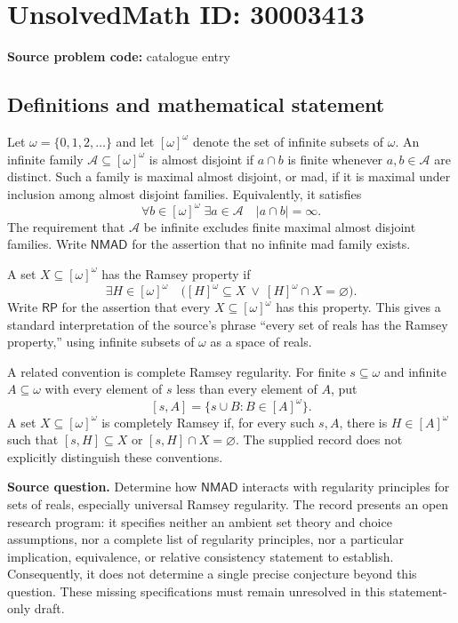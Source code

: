 \documentclass[11pt]{article}
\begin{document}
\section*{UnsolvedMath ID: 30003413}
\textbf{Source problem code:} catalogue entry
\subsection{Definitions and mathematical statement}
Let \(\omega=\{0,1,2,\ldots\}\) and let \([\omega]^\omega\) denote the set of infinite subsets of \(\omega\). An infinite family \(\mathcal A\subseteq[\omega]^\omega\) is almost disjoint if \(a\cap b\) is finite whenever \(a,b\in\mathcal A\) are distinct. Such a family is maximal almost disjoint, or mad, if it is maximal under inclusion among almost disjoint families. Equivalently, it satisfies
\[
\forall b\in[\omega]^\omega\;\exists a\in\mathcal A\quad |a\cap b|=\infty.
\]
The requirement that \(\mathcal A\) be infinite excludes finite maximal almost disjoint families. Write \(\mathsf{NMAD}\) for the assertion that no infinite mad family exists.

A set \(X\subseteq[\omega]^\omega\) has the Ramsey property if
\[
\exists H\in[\omega]^\omega\quad
\bigl([H]^\omega\subseteq X\ \lor\ [H]^\omega\cap X=\varnothing\bigr).
\]
Write \(\mathsf{RP}\) for the assertion that every \(X\subseteq[\omega]^\omega\) has this property. This gives a standard interpretation of the source's phrase ``every set of reals has the Ramsey property,'' using infinite subsets of \(\omega\) as a space of reals.

A related convention is complete Ramsey regularity. For finite \(s\subseteq\omega\) and infinite \(A\subseteq\omega\) with every element of \(s\) less than every element of \(A\), put
\[
[s,A]=\{s\cup B:B\in[A]^\omega\}.
\]
A set \(X\subseteq[\omega]^\omega\) is completely Ramsey if, for every such \(s,A\), there is \(H\in[A]^\omega\) such that \([s,H]\subseteq X\) or \([s,H]\cap X=\varnothing\). The supplied record does not explicitly distinguish these conventions.

\textbf{Source question.} Determine how \(\mathsf{NMAD}\) interacts with regularity principles for sets of reals, especially universal Ramsey regularity. The record presents an open research program: it specifies neither an ambient set theory and choice assumptions, nor a complete list of regularity principles, nor a particular implication, equivalence, or relative consistency statement to establish. Consequently, it does not determine a single precise conjecture beyond this question. These missing specifications must remain unresolved in this statement-only draft.
\end{document}
